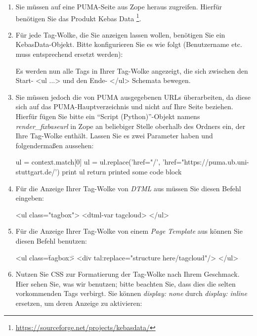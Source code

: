 \documentclass[b5paper,11pt,twoside]{scrbook} %
\begin{document}
\begin{enumerate}
    \item Sie müssen auf eine PUMA-Seite aus Zope heraus zugreifen. Hierfür benötigen Sie das Produkt Kebas Data \footnote{\url{https://sourceforge.net/projects/kebasdata/}}.
    \item Für jede Tag-Wolke, die Sie anzeigen lassen wollen, benötigen Sie ein KebasData-Objekt. Bitte konfigurieren Sie es wie folgt (Benutzername etc. muss entsprechend ersetzt werden):%

    Es werden nun alle Tags in Ihrer Tag-Wolke angezeigt, die sich zwischen den Start- <ul ...> und den Ende- </ul> Schemata bewegen.
    \item Sie müssen jedoch die von PUMA ausgegebenen URLs überarbeiten, da diese sich auf das PUMA-Hauptverzeichnis und nicht auf Ihre Seite beziehen. Hierfür fügen Sie bitte ein \enquote{Script (Python)}-Objekt namens \textit{render\_fixbaseurl} in Zope an beliebiger Stelle oberhalb des Ordners ein, der Ihre Tag-Wolke enthält. Lassen Sie es zwei Parameter haben und folgendermaßen aussehen: 

    ul = context.match[0]\newline
    ul = ul.replace('href="/', 'href="https://puma.ub.uni-stuttgart.de/')\newline
    print ul\newline
    return printed\newline
    some code block

    \item Für die Anzeige Ihrer Tag-Wolke von \textit{DTML} aus müssen Sie diesen Befehl eingeben: 

    <ul class="tagbox">\newline
        <dtml-var tagcloud>\newline
    </ul> \newline

    \item Für die Anzeige Ihrer Tag-Wolke von einem \textit{Page Template} aus können Sie diesen Befehl benutzen: 

    <ul class=\"tagbox\">\newline
        <div tal:replace="structure here/tagcloud"/>\newline
    </ul>\newline

    \item Nutzen Sie CSS zur Formatierung der Tag-Wolke nach Ihrem Geschmack. Hier sehen Sie, was wir benutzen; bitte beachten Sie, dass dies die selten vorkommenden Tags verbirgt. Sie können \textit{display: none} durch \textit{display: inline} ersetzen, um deren Anzeige zu aktivieren: 


\end{enumerate}
\end{document}
